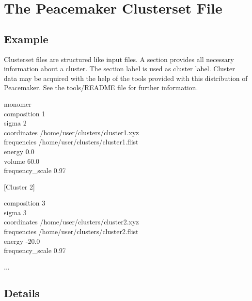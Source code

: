 \documentclass{scrartcl}
\begin{document}
\newpage
\section{The Peacemaker Clusterset File}
\label{sec:clusterset}

\subsection{Example}

Clusterset files are structured like input files.
A section provides all necessary information about a cluster.
The section label is used as cluster label.
Cluster data may be acquired with the help of the tools provided with this distribution of Peacemaker.
See the tools/README file for further information.

\clearpage
\begin{addmargin}[1cm]{0cm}
    \ttfamily
    [Cluster 1]
    \begin{addmargin}[1cm]{0cm}
        monomer \\
        composition 1 \\
        sigma 2 \\
        coordinates /home/user/clusters/cluster1.xyz \\
        frequencies /home/user/clusters/cluster1.flist \\
        energy 0.0 \\
        volume 60.0 \\
        frequency\_scale 0.97
    \end{addmargin}
    [Cluster 2]
    \begin{addmargin}[1cm]{0cm}
        composition 3 \\
        sigma 3 \\
        coordinates /home/user/clusters/cluster2.xyz \\
        frequencies /home/user/clusters/cluster2.flist \\
        energy -20.0 \\
        frequency\_scale 0.97
    \end{addmargin}
    ...
\end{addmargin}

\subsection{Details}
\end{document}
